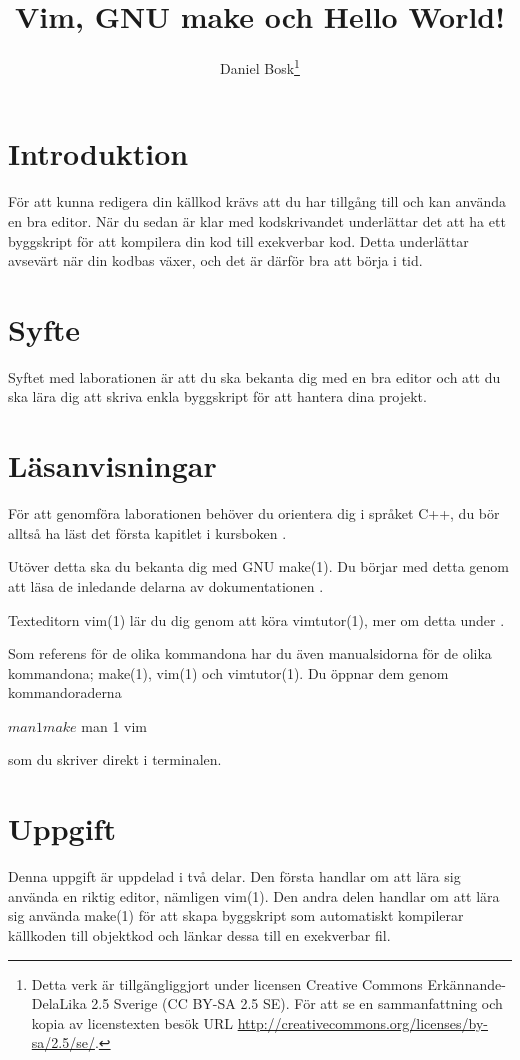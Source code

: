 \documentclass[a4paper]{miunasgn}
\title{Vim, GNU make och Hello World!}
\author{Daniel Bosk\footnote{%
	Detta verk är tillgängliggjort under licensen Creative Commons 
	Erkännande-DelaLika 2.5 Sverige (CC BY-SA 2.5 SE).
	För att se en sammanfattning och kopia av licenstexten besök URL 
	\url{http://creativecommons.org/licenses/by-sa/2.5/se/}.
}}
\date{\svnId}
\begin{document}
\maketitle
\thispagestyle{foot}
\tableofcontents


\section{Introduktion}
\noindent
För att kunna redigera din källkod krävs att du har tillgång till och kan 
använda en bra editor.
När du sedan är klar med kodskrivandet underlättar det att ha ett byggskript 
för att kompilera din kod till exekverbar kod.
Detta underlättar avsevärt när din kodbas växer, och det är därför bra att 
börja i tid.


\section{Syfte}
\noindent
Syftet med laborationen är att du ska bekanta dig med en bra editor och att du 
ska lära dig att skriva enkla byggskript för att hantera dina projekt.


\section{Läsanvisningar}
\label{sec:Prerequisites}
\noindent
För att genomföra laborationen behöver du orientera dig i språket C++, du bör 
alltså ha läst det första kapitlet i kursboken \cite{Deitel2012cht}.

Utöver detta ska du bekanta dig med GNU make(1).
Du börjar med detta genom att läsa de inledande delarna av dokumentationen 
\cite[avsnitt 1.1 till och med 2.2]{gnumake}.

Texteditorn vim(1) lär du dig genom att köra vimtutor(1), mer om detta under 
.

Som referens för de olika kommandona har du även manualsidorna för de olika 
kommandona; make(1), vim(1) och vimtutor(1).
Du öppnar dem genom kommandoraderna
\begin{terminal}
$ man 1 make
$ man 1 vim
\end{terminal}
som du skriver direkt i terminalen.


\section{Uppgift}
\label{sec:Tasks}
\noindent
Denna uppgift är uppdelad i två delar.
Den första handlar om att lära sig använda en riktig editor, nämligen vim(1).
Den andra delen handlar om att lära sig använda make(1) för att skapa 
byggskript som automatiskt kompilerar källkoden till objektkod och länkar dessa 
till en exekverbar fil.
\end{document}

